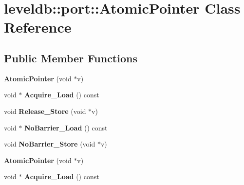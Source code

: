 \hypertarget{classleveldb_1_1port_1_1_atomic_pointer}{}\section{leveldb\+::port\+::Atomic\+Pointer Class Reference}
\label{classleveldb_1_1port_1_1_atomic_pointer}
\subsection*{Public Member Functions}
\begin{DoxyCompactItemize}
\item 
\mbox{\label{classleveldb_1_1port_1_1_atomic_pointer_aa8640431ad3d0ac2f0de62ef6090e89e}} 
{\bfseries Atomic\+Pointer} (void $\ast$v)
\item 
\mbox{\label{classleveldb_1_1port_1_1_atomic_pointer_a88802d6fa5a577739e779ae2d832e4be}} 
void $\ast$ {\bfseries Acquire\+\_\+\+Load} () const
\item 
\mbox{\label{classleveldb_1_1port_1_1_atomic_pointer_a8dfe51c125f71c09a363dae042be63a7}} 
void {\bfseries Release\+\_\+\+Store} (void $\ast$v)
\item 
\mbox{\label{classleveldb_1_1port_1_1_atomic_pointer_ad491b84dca13bb1b24e10fb996f94ab4}} 
void $\ast$ {\bfseries No\+Barrier\+\_\+\+Load} () const
\item 
\mbox{\label{classleveldb_1_1port_1_1_atomic_pointer_aa7faab23777d1fe3c1a96d32a28ed20c}} 
void {\bfseries No\+Barrier\+\_\+\+Store} (void $\ast$v)
\item 
\mbox{\label{classleveldb_1_1port_1_1_atomic_pointer_aa8640431ad3d0ac2f0de62ef6090e89e}} 
{\bfseries Atomic\+Pointer} (void $\ast$v)
\item 
\mbox{\label{classleveldb_1_1port_1_1_atomic_pointer_a18b8f3a214f5ea8c942786d4c18aaa6c}} 
void $\ast$ {\bfseries Acquire\+\_\+\+Load} () const
\item 

\end{DoxyCompactItemize}

